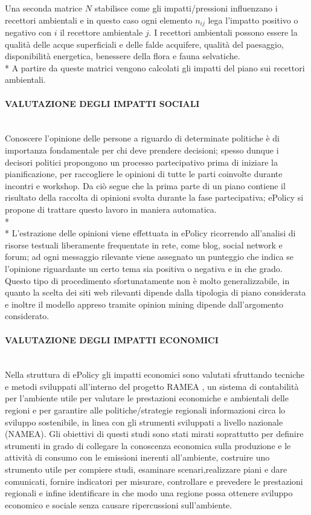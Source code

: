 \documentclass[12pt,a4paper,openright,twoside]{report}
\newcommand{\myparagraph}[1]{\paragraph{#1}\mbox{}\\}
\begin{document}
Una seconda matrice $N$ stabilisce come gli impatti/pressioni influenzano i recettori ambientali e in questo caso ogni elemento $n_{ij}$ lega l'impatto positivo o negativo con $i$ il recettore ambientale $j$. I recettori ambientali possono essere la qualità delle acque superficiali e delle falde acquifere, qualità del paesaggio, disponibilità energetica, benessere della flora e fauna selvatiche.\\*
A partire da queste matrici vengono calcolati gli impatti del piano sui recettori ambientali.

\myparagraph{VALUTAZIONE DEGLI IMPATTI SOCIALI}
Conoscere l'opinione delle persone a riguardo di determinate politiche è di importanza fondamentale per chi deve prendere decisioni; spesso dunque i decisori politici propongono un processo partecipativo prima di iniziare la pianificazione, per raccogliere le opinioni di tutte le parti coinvolte durante incontri e workshop. Da ciò segue che la prima parte di un piano contiene il risultato della raccolta di opinioni svolta durante la fase partecipativa; ePolicy si propone di trattare questo lavoro in maniera automatica.\\*\\*
L'estrazione delle opinioni viene effettuata in ePolicy ricorrendo all'analisi di risorse testuali liberamente frequentate in rete, come blog, social network e forum; ad ogni messaggio rilevante viene assegnato un punteggio che indica se l'opinione riguardante un certo tema sia positiva o negativa e in che grado. Questo tipo di procedimento sfortunatamente non è molto generalizzabile, in quanto la scelta dei siti web rilevanti dipende dalla tipologia di piano considerata e inoltre il modello appreso tramite opinion mining dipende dall'argomento considerato.

\myparagraph{VALUTAZIONE DEGLI IMPATTI ECONOMICI}
Nella struttura di ePolicy gli impatti economici sono valutati sfruttando tecniche e metodi sviluppati all'interno del progetto RAMEA \cite{ramea}, un sistema di contabilità per l'ambiente utile per valutare le prestazioni economiche e ambientali delle regioni e per garantire alle politiche/strategie regionali informazioni circa lo sviluppo sostenibile, in linea con gli strumenti sviluppati a livello nazionale (NAMEA). Gli obiettivi di questi studi sono stati mirati soprattutto per definire strumenti in grado di collegare la conoscenza economica sulla produzione e le attività di consumo con le emissioni inerenti all'ambiente, costruire uno strumento utile per compiere studi, esaminare scenari,realizzare piani e dare comunicati, fornire indicatori per misurare, controllare e prevedere le prestazioni regionali e infine identificare in che modo una regione possa ottenere sviluppo economico e sociale senza causare ripercussioni sull'ambiente.
\end{document}
